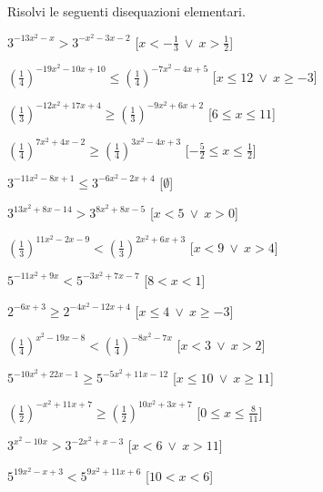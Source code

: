\begin{esercizio}\label{ese:}
 Risolvi le seguenti disequazioni elementari.
 \begin{enumeratea}
  \item  \(3^{-13 x^2 - x } > 3^{- x^2 -3 x -2}\)
   \hfill [\(x < -\frac{1}{3}~\vee~x > \frac{1}{2}\)]
  \item  \(\left(\frac{1}{4}\right)^{-19 x^2 -10 x +10} \leqslant 
\left(\frac{1}{4}\right)^{-7 x^2 -4 x +5}\)
   \hfill [\(x \leqslant 12~\vee~x \geqslant -3\)]
  \item  \(\left(\frac{1}{3}\right)^{-12 x^2 +17 x +4} \geqslant 
\left(\frac{1}{3}\right)^{-9 x^2 +6 x +2}\)
   \hfill [\(6 \leqslant x \leqslant 11\)]
  \item  \(\left(\frac{1}{4}\right)^{7 x^2 +4 x -2} \geqslant 
\left(\frac{1}{4}\right)^{3 x^2 -4 x +3}\)
   \hfill [\(-\frac{5}{2} \leqslant x \leqslant \frac{1}{2}\)]
  \item  \(3^{-11 x^2 -8 x +1} \leqslant 3^{-6 x^2 -2 x +4}\)
   \hfill [\(\emptyset\)]
  \item  \(3^{13 x^2 +8 x -14} > 3^{8 x^2 +8 x -5}\)
   \hfill [\(x < 5~\vee~x > 0\)]
  \item  \(\left(\frac{1}{3}\right)^{11 x^2 -2 x -9} < 
\left(\frac{1}{3}\right)^{2 x^2 +6 x +3}\)
   \hfill [\(x < 9~\vee~x > 4\)]
  \item  \(5^{-11 x^2 +9 x } < 5^{-3 x^2 +7 x -7}\)
   \hfill [\(8 < x < 1\)]
  \item  \(2^{-6 x +3} \geqslant 2^{-4 x^2 -12 x +4}\)
   \hfill [\(x \leqslant 4~\vee~x \geqslant -3\)]
  \item  \(\left(\frac{1}{4}\right)^{x^2 -19 x -8} < 
\left(\frac{1}{4}\right)^{-8 x^2 -7 x }\)
   \hfill [\(x < 3~\vee~x > 2\)]
  \item  \(5^{-10 x^2 +22 x -1} \geqslant 5^{-5 x^2 +11 x -12}\)
   \hfill [\(x \leqslant 10~\vee~x \geqslant 11\)]
  \item  \(\left(\frac{1}{2}\right)^{- x^2 +11 x +7} \geqslant 
\left(\frac{1}{2}\right)^{10 x^2 +3 x +7}\)
   \hfill [\(0 \leqslant x \leqslant \frac{8}{11}\)]
  \item  \(3^{x^2 -10 x } > 3^{-2 x^2 + x -3}\)
   \hfill [\(x < 6~\vee~x > 11\)]
  \item  \(5^{19 x^2 - x +3} < 5^{9 x^2 +11 x +6}\)
   \hfill [\(10 < x < 6\)]

 \end{enumeratea}
\end{esercizio}

